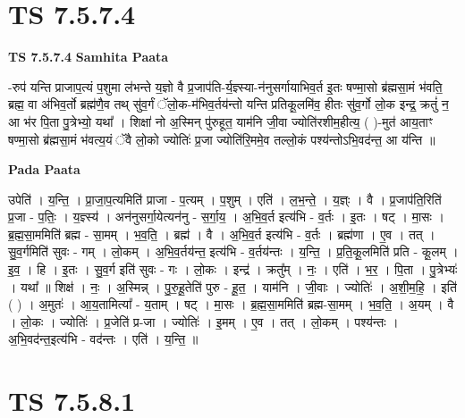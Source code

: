 \documentclass[17pt]{extarticle}
\begin{document}
\section*{ TS 7.5.7.4 }

\textbf{TS 7.5.7.4 } \newline
\textbf{Samhita Paata} \newline

-रुप॑ यन्ति प्राजाप॒त्यं प॒शुमा ल॑भन्ते य॒ज्ञो वै प्र॒जाप॑ति-र्य॒ज्ञ्स्या-न॑नुसर्गायाभिव॒र्त इ॒तः षण्मा॒सो ब्र॑ह्मसा॒मं भ॑वति॒ ब्रह्म॒ वा अ॑भिव॒र्तो ब्रह्म॑णै॒व तथ् सु॑व॒र्गं ॅलो॒क-म॑भिव॒र्तय॑न्तो यन्ति प्रतिकू॒लमि॑व॒ हीतः सु॑व॒र्गो लो॒क इन्द्र॒ क्रतुं॑ न॒ आ भ॑र पि॒ता पु॒त्रेभ्यो॒ यथा᳚ । शिक्षा॑ नो अ॒स्मिन् पु॑रुहूत॒ याम॑नि जी॒वा ज्योति॑रशीम॒हीत्य॒ ( )-मुत॑ आय॒ताꣳ षण्मा॒सो ब्र॑ह्मसा॒मं भ॑वत्य॒यं ॅवै लो॒को ज्योतिः॑ प्र॒जा ज्योति॑रि॒ममे॒व तल्लो॒कं पश्य॑न्तोऽभि॒वद॑न्त॒ आ य॑न्ति ॥ \newline

\textbf{Pada Paata} \newline

उपेति॑ । य॒न्ति॒ । प्रा॒जा॒प॒त्यमिति॑ प्राजा - प॒त्यम् । प॒शुम् । एति॑ । ल॒भ॒न्ते॒ । य॒ज्ञ्ः । वै । प्र॒जाप॑ति॒रिति॑ प्र॒जा - प॒तिः॒ । य॒ज्ञ्स्य॑ । अन॑नुसर्गा॒येत्यन॑नु - स॒र्गा॒य॒ । अ॒भि॒व॒र्त इत्य॑भि - व॒र्तः । इ॒तः । षट् । मा॒सः । ब्र॒ह्म॒सा॒ममिति॑ ब्रह्म - सा॒मम् । भ॒व॒ति॒ । ब्रह्म॑ । वै । अ॒भि॒व॒र्त इत्य॑भि - व॒र्तः । ब्रह्म॑णा । ए॒व । तत् । सु॒व॒र्गमिति॑ सुवः - गम् । लो॒कम् । अ॒भि॒व॒र्तय॑न्त॒ इत्य॑भि - व॒र्तय॑न्तः । य॒न्ति॒ । प्र॒ति॒कू॒लमिति॑ प्रति - कू॒लम् । इ॒व॒ । हि । इ॒तः । सु॒व॒र्ग इति॑ सुवः - गः । लो॒कः । इन्द्र॑ । क्रतु᳚म् । नः॒ । एति॑ । भ॒र॒ । पि॒ता । पु॒त्रेभ्यः॑ । यथा᳚ ॥ शिक्ष॑ । नः॒ । अ॒स्मिन्न् । पु॒रु॒हू॒तेति॑ पुरु - हू॒त॒ । याम॑नि । जी॒वाः । ज्योतिः॑ । अ॒शी॒म॒हि॒ । इति॑ ( ) । अ॒मुतः॑ । आ॒य॒तामित्या᳚ - य॒ताम् । षट् । मा॒सः । ब्र॒ह्म॒सा॒ममिति॑ ब्रह्म-सा॒मम् । भ॒व॒ति॒ । अ॒यम् । वै । लो॒कः । ज्योतिः॑ । प्र॒जेति॑ प्र-जा । ज्योतिः॑ । इ॒मम् । ए॒व । तत् । लो॒कम् । पश्य॑न्तः । अ॒भि॒वद॑न्त॒इत्य॑भि - वद॑न्तः । एति॑ । य॒न्ति॒ ॥  \newline




\section*{ TS 7.5.8.1 }
\end{document}

